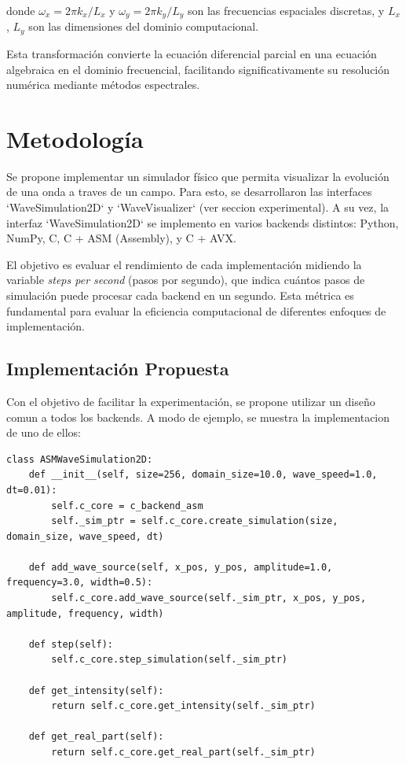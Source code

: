 \documentclass[a4paper]{article}
\begin{document}
donde $\omega_x = 2\pi k_x/L_x$ y $\omega_y = 2\pi k_y/L_y$ son las frecuencias espaciales discretas, y $L_x$, $L_y$ son las dimensiones del dominio computacional.

Esta transformación convierte la ecuación diferencial parcial en una ecuación algebraica en el dominio frecuencial, facilitando
significativamente su resolución numérica mediante métodos espectrales.

\section{Metodología}
Se propone implementar un simulador físico que permita visualizar la evolución de una onda a traves de un campo. Para esto, se desarrollaron
las interfaces `WaveSimulation2D` y `WaveVisualizer` (ver seccion experimental). A su vez, la interfaz `WaveSimulation2D` se implemento en varios
backends distintos: Python, NumPy, C, C + ASM (Assembly), y C + AVX.

El objetivo es evaluar el rendimiento de cada implementación midiendo la variable \textit{steps per second} (pasos por segundo), que
indica cuántos pasos de simulación puede procesar cada backend en un segundo. Esta métrica es fundamental para evaluar la eficiencia
computacional de diferentes enfoques de implementación.

\subsection{Implementación Propuesta}
Con el objetivo de facilitar la experimentación, se propone utilizar un diseño comun a todos los backends. A modo de ejemplo, se muestra
la implementacion de uno de ellos:

\begin{verbatim}
class ASMWaveSimulation2D:
    def __init__(self, size=256, domain_size=10.0, wave_speed=1.0, dt=0.01):
        self.c_core = c_backend_asm
        self._sim_ptr = self.c_core.create_simulation(size, domain_size, wave_speed, dt)
    
    def add_wave_source(self, x_pos, y_pos, amplitude=1.0, frequency=3.0, width=0.5):
        self.c_core.add_wave_source(self._sim_ptr, x_pos, y_pos, amplitude, frequency, width)
    
    def step(self):
        self.c_core.step_simulation(self._sim_ptr)
    
    def get_intensity(self):
        return self.c_core.get_intensity(self._sim_ptr)
    
    def get_real_part(self):
        return self.c_core.get_real_part(self._sim_ptr)
\end{verbatim}
\end{document}
